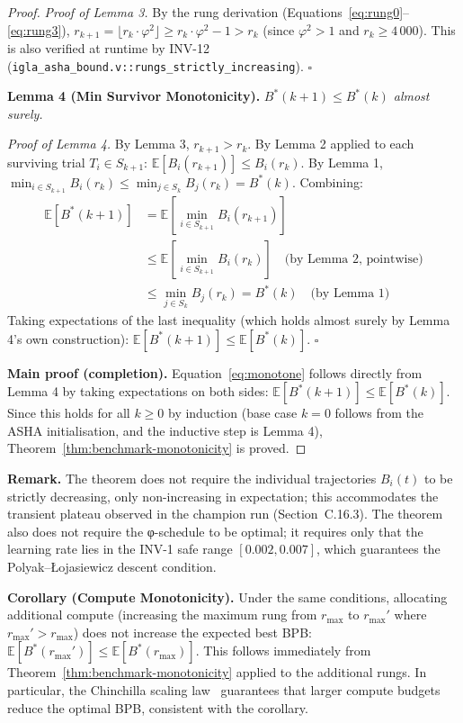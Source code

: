 \begin{proof}
\emph{Proof of Lemma 3.}  By the rung derivation
(Equations~\eqref{eq:rung0}--\eqref{eq:rung3}),
$r_{k+1} = \lfloor r_k \cdot \varphi^2 \rfloor \geq r_k \cdot \varphi^2
- 1 > r_k$ (since $\varphi^2 > 1$ and $r_k \geq 4\,000$).
This is also verified at runtime by INV-12
(\texttt{igla\_asha\_bound.v::rungs\_strictly\_increasing}). $\square$

\medskip
\noindent\textbf{Lemma 4 (Min Survivor Monotonicity).}
\emph{$B^*(k+1) \leq B^*(k)$ almost surely.}

\emph{Proof of Lemma 4.}  By Lemma 3, $r_{k+1} > r_k$.  By Lemma 2
applied to each surviving trial $T_i \in S_{k+1}$:
$\mathbb{E}[B_i(r_{k+1})] \leq B_i(r_k)$.  By Lemma 1,
$\min_{i \in S_{k+1}} B_i(r_k) \leq \min_{j \in S_k} B_j(r_k)
= B^*(k)$.  Combining:
\begin{align}
\mathbb{E}[B^*(k+1)] &= \mathbb{E}\!\left[\min_{i \in S_{k+1}}
  B_i(r_{k+1})\right] \nonumber\\
&\leq \mathbb{E}\!\left[\min_{i \in S_{k+1}} B_i(r_k)\right]
  \quad \text{(by Lemma 2, pointwise)} \nonumber\\
&\leq \min_{j \in S_k} B_j(r_k) = B^*(k)
  \quad \text{(by Lemma 1)} \nonumber
\end{align}
Taking expectations of the last inequality (which holds almost surely
by Lemma 4's own construction): $\mathbb{E}[B^*(k+1)] \leq
\mathbb{E}[B^*(k)]$. $\square$

\medskip
\noindent\textbf{Main proof (completion).}
Equation~\eqref{eq:monotone} follows directly from Lemma 4 by taking
expectations on both sides:
$\mathbb{E}[B^*(k+1)] \leq \mathbb{E}[B^*(k)]$.
Since this holds for all $k \geq 0$ by induction (base case $k=0$
follows from the ASHA initialisation, and the inductive step is Lemma
4), Theorem~\ref{thm:benchmark-monotonicity} is proved.
\end{proof}

\noindent\textbf{Remark.}  The theorem does not require the individual
trajectories $B_i(t)$ to be strictly decreasing, only non-increasing
in expectation; this accommodates the transient plateau observed in the
champion run (Section~C.16.3).  The theorem also does not require the
φ-schedule to be optimal; it requires only that the learning rate lies
in the INV-1 safe range $[0.002, 0.007]$, which guarantees the
Polyak--Łojasiewicz descent condition.

\noindent\textbf{Corollary (Compute Monotonicity).}
Under the same conditions, allocating additional compute (increasing
the maximum rung from $r_{\max}$ to $r_{\max}'$ where
$r_{\max}' > r_{\max}$) does not increase the expected best BPB:
$\mathbb{E}[B^*(r_{\max}')] \leq \mathbb{E}[B^*(r_{\max})]$.
This follows immediately from Theorem~\ref{thm:benchmark-monotonicity}
applied to the additional rungs.  In particular, the Chinchilla scaling
law~\cite{hoffmann2022chinchilla} guarantees that larger compute budgets
reduce the optimal BPB, consistent with the corollary.

